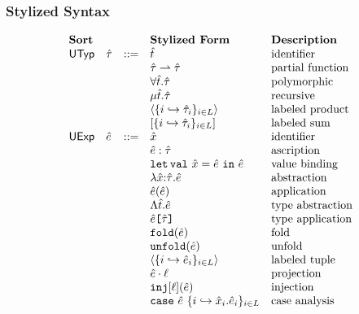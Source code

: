 \subsubsection{Stylized Syntax}
\[\begin{array}{lllllll}
\textbf{Sort} & &  
& \textbf{Stylized Form} & \textbf{Description}\\
\mathsf{UTyp} & \utau & ::= 
& \ut & \text{identifier}\\
&& 
& \parr{\utau}{\utau} & \text{partial function}\\
&&
& \forallt{\ut}{\utau} & \text{polymorphic}\\
&&
& \rect{\ut}{\utau} & \text{recursive}\\
&&
& \prodt{\mapschema{\utau}{i}{\labelset}} & \text{labeled product}\\
&&
& \sumt{\mapschema{\utau}{i}{\labelset}} & \text{labeled sum}\\
\mathsf{UExp} & \ue & ::= 
& \ux & \text{identifier}\\
&&
%
& \asc{\ue}{\utau} & \text{ascription}\\
&&
%
& \letsyn{\ux}{\ue}{\ue} & \text{value binding}\\
&&
& \lam{\ux}{\utau}{\ue} & \text{abstraction}\\
&&
& \ap{\ue}{\ue} & \text{application}\\
&&
& \Lam{\ut}{\ue} & \text{type abstraction}\\
&&
& \App{\ue}{\utau} & \text{type application}\\
&&
& \fold{\ue} & \text{fold}\\
&&
& \unfold{\ue} & \text{unfold}\\
&&
& \tpl{\mapschema{\ue}{i}{\labelset}} & \text{labeled tuple}\\
&&
& \prj{\ue}{\ell} & \text{projection}\\
&&
& \inj{\ell}{\ue} & \text{injection}\\
&&
& \caseof{\ue}{\mapschemab{\ux}{\ue}{i}{\labelset}} & \text{case analysis}\\

\end{array}\]
